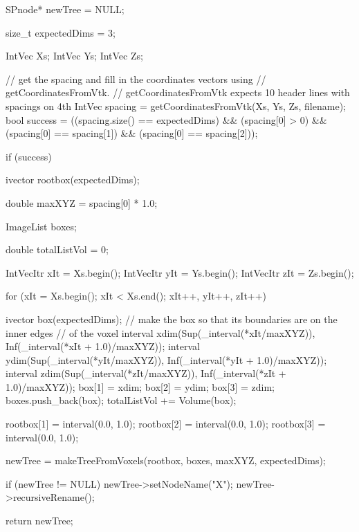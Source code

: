 \begin{DoxyCode}
    {
        SPnode* newTree = NULL;

        size_t expectedDims = 3;

        IntVec Xs;
        IntVec Ys;
        IntVec Zs;

        // get the spacing and fill in the coordinates vectors using
        // getCoordinatesFromVtk.
        // getCoordinatesFromVtk expects 10 header lines with spacings on 4th
        IntVec spacing = getCoordinatesFromVtk(Xs, Ys, Zs, filename);
        bool success = ((spacing.size() == expectedDims) && (spacing[0] > 0)
                                && (spacing[0] == spacing[1])
                                && (spacing[0] == spacing[2]));

        if (success) {

            ivector rootbox(expectedDims);

            double maxXYZ = spacing[0] * 1.0;

            ImageList boxes;

            double totalListVol = 0;

            IntVecItr xIt = Xs.begin();
            IntVecItr yIt = Ys.begin();
            IntVecItr zIt = Zs.begin();

            for (xIt = Xs.begin(); xIt < Xs.end(); xIt++, yIt++, zIt++) {
                ivector box(expectedDims);
                // make the box so that its boundaries are on the inner edges
                // of the voxel
                interval xdim(Sup(_interval(*xIt/maxXYZ)),
                            Inf(_interval(*xIt + 1.0)/maxXYZ));
                interval ydim(Sup(_interval(*yIt/maxXYZ)),
                            Inf(_interval(*yIt + 1.0)/maxXYZ));
                interval zdim(Sup(_interval(*zIt/maxXYZ)),
                            Inf(_interval(*zIt + 1.0)/maxXYZ));
                box[1] = xdim;
                box[2] = ydim;
                box[3] = zdim;
                boxes.push_back(box);
                totalListVol += Volume(box);

            }

            rootbox[1] = interval(0.0, 1.0);
            rootbox[2] = interval(0.0, 1.0);
            rootbox[3] = interval(0.0, 1.0);


            newTree = makeTreeFromVoxels(rootbox, boxes,
                                        maxXYZ, expectedDims);
        }

        if (newTree != NULL) {
            newTree->setNodeName("X");
            newTree->recursiveRename();
        }


        return newTree;
    }
\end{DoxyCode}


